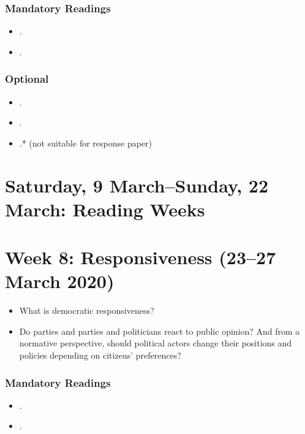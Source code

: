 \documentclass[abstract=on,parskip=full,headings=standardclasses,fontsize=11pt,paper=a4]{scrartcl}
\begin{document}
\subsubsection*{Mandatory Readings}
\begin{itemize}
\item {}.
\item {}.
\end{itemize}


\subsubsection*{Optional}
\begin{itemize}
\item {}.
\item {}.
\item {}.*  (not suitable for response paper)
\end{itemize}


\section{Saturday, 9 March--Sunday, 22 March: Reading Weeks}


\section{Week 8:  Responsiveness (23--27 March 2020)}

\begin{itemize}
\renewcommand\labelitemi{--}
\item What is democratic responsiveness?
\item Do parties and parties and politicians react to public opinion?  And from a normative perspective, should political actors change their positions and policies depending on citizens' preferences?
\end{itemize}

\subsubsection*{Mandatory Readings}
\begin{itemize}
\item {}.
\item {}.
\end{itemize}
\end{document}
